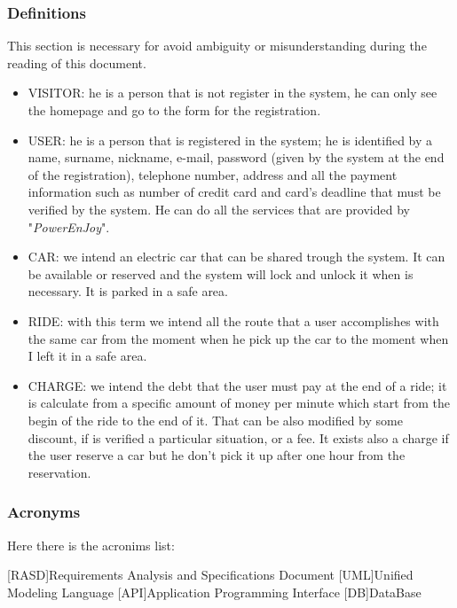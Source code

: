 \subsubsection{Definitions} \label{def}
This section is necessary for avoid ambiguity or misunderstanding during the reading of this document. 
\begin{itemize}
\item VISITOR: he is a person that is not register in the system, he can only see the homepage and go to the form for the registration.
\item USER: he is a person that is registered in the system; he is identified by a name, surname, nickname, e-mail, password (given by the system at the end of the registration), telephone number, address and all the payment information such as number of credit card and card's deadline that must be verified by the system. He can do all the services that are provided by "\emph{PowerEnJoy}".
\item CAR: we intend an electric car that can be shared trough the system. It can be available or reserved and the system will lock and unlock it when is necessary. It is parked in a safe area.
\item RIDE: with this term we intend all the route that a user accomplishes with the same car from the moment when he pick up the car to the moment when I left it in a safe area.   
\item CHARGE: we intend the debt that the user must pay at the end of a ride; it is calculate from a specific amount of money per minute which start from the begin of the ride to the end of it. That can be also modified  by some discount, if is verified a particular situation, or a fee. It exists also a charge if the user reserve a car but he don't pick it up after one hour from the reservation.  

\end{itemize}

\subsubsection{Acronyms} \label{acr}
Here there is the acronims list:

\begin{acronym}[RASD] %

[RASD]{Requirements Analysis and Specifications Document}
[UML]{Unified Modeling Language}
[API]{Application Programming Interface}
[DB]{DataBase}

\end{acronym}

